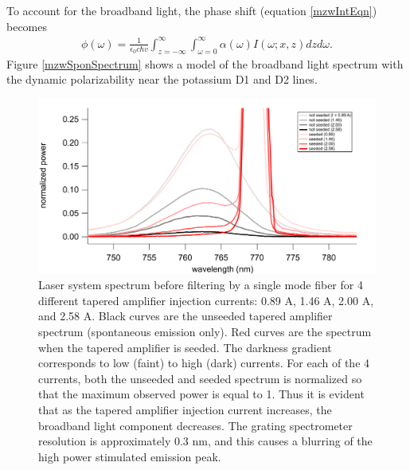 To account for the broadband light, the phase shift (equation \ref{mzwIntEqn}) becomes
\begin{eqnarray}
\label{mzwIntEqnASE}
\phi(\omega) = \frac{1}{\epsilon_0 c \hbar v} \int_{z=-\infty}^{\infty} \int_{\omega=0}^{\infty} \alpha(\omega)  I(\omega;x,z) dz d\omega.
\end{eqnarray}
Figure \ref{mzwSponSpectrum} shows a model of the broadband light spectrum with the dynamic polarizability near the potassium D1 and D2 lines.


\begin{figure}
\centerline{\includegraphics[width=.9\textwidth]{Figures/ASEdata.pdf}}
\caption[Laser spectrum measured with a grating spectrometer.]{\label{mzwSponData}Laser system spectrum before filtering by a single mode fiber for 4 different tapered amplifier injection currents: 0.89 A, 1.46 A, 2.00 A, and 2.58 A. Black curves are the unseeded tapered amplifier spectrum (spontaneous emission only). Red curves are the spectrum when the tapered amplifier is seeded. The darkness gradient corresponds to low (faint) to high (dark) currents. For each of the 4 currents, both the unseeded and seeded spectrum is normalized so that the maximum observed power is equal to 1. Thus it is evident that as the tapered amplifier injection current increases, the broadband light component decreases. The grating spectrometer resolution is approximately 0.3 nm, and this causes a blurring of the high power stimulated emission peak.}
\end{figure}


